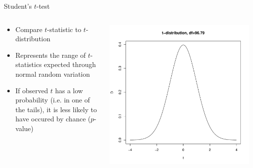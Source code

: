 \documentclass[aspectratio=169]{beamer}\usepackage[]{graphicx}\usepackage[]{color}
\makeatletter
\def\maxwidth{ %
  \ifdim\Gin@nat@width>\linewidth
    \linewidth
  \else
    \Gin@nat@width
  \fi
}
\newenvironment{knitrout}{}{} %
\makeatother
\begin{document}
\begin{frame}[fragile]{Student's $t$-test}
\begin{columns}
  \begin{column}{0.5\textwidth}
  \begin{itemize}
    \item Compare $t$-statistic to $t$-distribution
    \item Represents the range of $t$-statistics expected through normal random variation
    \item If observed $t$ has a low probability (i.e. in one of the tails), it is less likely to have occured by chance ($p$-value)
  \end{itemize}
  \end{column}
  \begin{column}{0.5\textwidth}
\begin{knitrout}\scriptsize
{}\color{fgcolor}
\includegraphics[width=\maxwidth]{figure/unnamed-chunk-22-1} 

\end{knitrout}
  \end{column}
\end{columns}
\end{frame}
\end{document}
